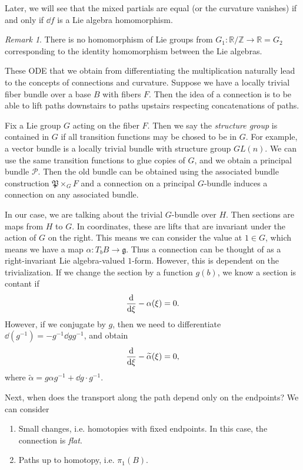 \documentclass[leqno, openany]{memoir}
\theoremstyle{definition}
\theoremstyle{remark}
\newtheorem{rmk}[thm]{Remark}
\theoremstyle{plain}
\theoremstyle{definition}
\theoremstyle{remark}
\newcommand{\R}{\mathbb{R}}
\newcommand{\Z}{\mathbb{Z}}
\newcommand{\mc}[1]{\mathcal{#1}}
\newcommand{\mf}[1]{\mathfrak{#1}}
\newcommand{\wtl}[1]{\widetilde{#1}}
\begin{document}
Later, we will see that the mixed partials are equal (or the curvature vanishes) if and only if $\dd f$ is a Lie algebra homomorphism.

\begin{rmk}
    There is no homomorphism of Lie groups from $G_1 \colon \R / \Z \to \R = G_2$ corresponding to the identity homomorphism between the Lie algebras.
\end{rmk}

These ODE that we obtain from differentiating the multiplication naturally lead to the concepts of connections and curvature. Suppose we have a locally trivial fiber bundle over a base $B$ with fibers $F$. Then the idea of a connection is to be able to lift paths downstairs to paths upstairs respecting concatenations of paths.

Fix a Lie group $G$ acting on the fiber $F$. Then we say the \textit{structure group} is contained in $G$ if all transition functions may be chosed to be in $G$. For example, a vector bundle is a locally trivial bundle with structure group $GL(n)$. We can use the same transition functions to glue copies of $G$, and we obtain a principal bundle $\mc{P}$. Then the old bundle can be obtained using the associated bundle construction $\mf{P} \times_G F$ and a connection on a principal $G$-bundle induces a connection on any associated bundle.

In our case, we are talking about the trivial $G$-bundle over $H$. Then sections are maps from $H$ to $G$. In coordinates, these are lifts that are invariant under the action of $G$ on the right. This means we can consider the value at $1 \in G$, which means we have a map $ \alpha \colon T_b B \to \mf{g}$. Thus a connection can be thought of as a right-invariant Lie algebra-valued $1$-form. However, this is dependent on the trivialization. If we change the section by a function $g(b)$, we know a section is contant if 
\[ \dv{\xi} - \alpha(\xi) = 0. \]
However, if we conjugate by $g$, then we need to differentiate $\dd (g^{-1}) = - g^{-1} \dd{g} g^{-1}$, and obtain
\[ \dv{\xi} - \wtl{\alpha}(\xi) = 0, \]
where $\wtl{\alpha} = g \alpha g^{-1} + \dd{g} \cdot g^{-1}$.

Next, when does the transport along the path depend only on the endpoints? We can consider
\begin{enumerate}
    \item Small changes, i.e. homotopies with fixed endpoints. In this case, the connection is \textit{flat}.
    \item Paths up to homotopy, i.e. $\pi_1(B)$.
\end{enumerate}
\end{document}
